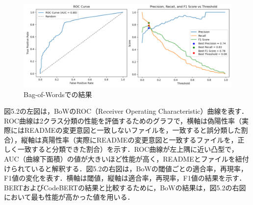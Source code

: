 \documentclass[submit]{ipsj}
\begin{document}
\begin{figure}[t]
 	\centering
		\includegraphics[width=1.0\linewidth]{./IPSJ202303_Ishioka/BoW_testdata.pdf}
	\caption{Bag-of-Wordsでの結果}
	\label{fig:oss_developments}
\end{figure}




図5.2の左図は，BoWのROC（Receiver Operating Characteristic）曲線を表す．ROC曲線は2クラス分類の性能を評価するためのグラフで，横軸は偽陽性率（実際にはREADMEの変更意図と一致しないファイルを，一致すると誤分類した割合），縦軸は真陽性率（実際にREADMEの変更意図と一致するファイルを，正しく一致すると分類できた割合）を示す．ROC曲線が左上隅に近い凸型で，AUC（曲線下面積）の値が大きいほど性能が高く，READMEとファイルを紐付けられていると解釈する．図5.2の右図は，BoWの閾値ごとの適合率，再現率，F1値の変化を表す．横軸は閾値，縦軸は適合率，再現率，F1値の結果を示す．BERTおよびCodeBERTの結果と比較するために，BoWの結果は，図5.2の右図において最も性能が高かった値を用いる．
\end{document}

